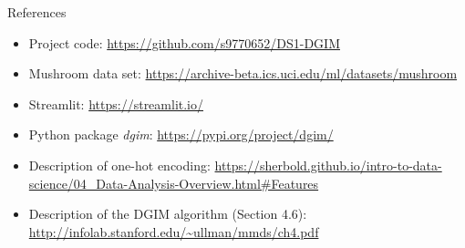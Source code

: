 \begin{frame}{References}
	\begin{itemize}
		\item
		Project code:
		\url{https://github.com/s9770652/DS1-DGIM}
		
		\item
		Mushroom data set:
		\url{https://archive-beta.ics.uci.edu/ml/datasets/mushroom}
		
		\item
		Streamlit:
		\url{https://streamlit.io/}
		
		\item
		Python package \emph{dgim}:
		\url{https://pypi.org/project/dgim/}
		
		\item
		Description of one-hot encoding:
		\url{https://sherbold.github.io/intro-to-data-science/04_Data-Analysis-Overview.html\#Features}
		
		\item
		Description of the DGIM algorithm (Section 4.6):
		\url{http://infolab.stanford.edu/~ullman/mmds/ch4.pdf}
	\end{itemize}
\end{frame}